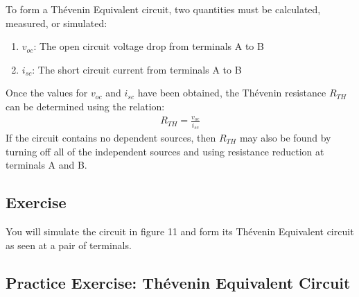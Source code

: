 \documentclass[12pt]{../manual}
\begin{document}
To form a Th\'evenin Equivalent circuit, two quantities must be calculated, measured, or simulated:
\begin{enumerate}
\item $v_{oc}$: The open circuit voltage drop from terminals A to B
\item $i_{sc}$: The short circuit current from terminals A to B
\end{enumerate}
Once the values for $v_{oc}$ and $i_{sc}$ have been obtained, the Th\'evenin resistance $R_{TH}$ can be determined using the relation:
\begin{align}
R_{TH} = \frac{v_{oc}}{i_{sc}}
\end{align}
If the circuit contains no dependent sources, then $R_{TH}$ may also be found by turning off all of the independent sources and using resistance reduction at terminals A and B.

\subsection{Exercise}
You will simulate the circuit in figure 11 and form its Th\'evenin Equivalent circuit as seen at a pair of terminals.
\subsection{Practice Exercise: Th\'evenin Equivalent Circuit}
%
\newpage
{} %
\end{document}
